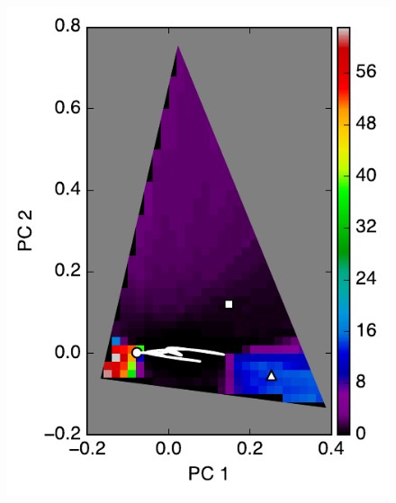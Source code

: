 \documentclass[iop,numberedappendix,apj,]{emulateapj}
\begin{document}
\begin{figure}[tbh!]
\begin{minipage}{0.33\hsize}
\begin{center}
\includegraphics[width=\hsize]{mockdata_135deg_3types_t360_lc_noreg.pdf}
    \end{center}
     \end{minipage}
   \begin{minipage}{0.33\hsize}
    \begin{center}

\end{center}
\end{minipage}
\end{figure}
\end{document}
